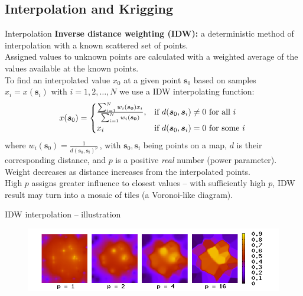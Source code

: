 \documentclass{beamer}
\begin{document}
\subsection{Interpolation and Krigging}
\begin{frame}{Interpolation}
\small
\textbf{Inverse distance weighting (IDW):} a deterministic method of interpolation with a known scattered set of points. \\ \smallskip Assigned values to unknown points are calculated with a weighted average of the values available at the known points.
\\ \smallskip 
To find an interpolated value $x_0$ at a given point $\bm{s}_0$ based on samples $x_i=x(\bm{s}_i)$ with $i=1,2,\dots,N$ we use a IDW interpolating function:
$$
x(\bm{s}_0) = 
\begin{cases}
    \frac{\sum_{i=1}^N w_i(\bm{s_0})x_i}{\sum_{i=1}^N w_i(\bm{s_0})}, & 
    \textnormal{if~} d(\bm{s}_0,\bm{s}_i) \neq 0 \textnormal{~for all~}i\\
    x_i & \textnormal{if~} d(\bm{s}_0,\bm{s}_i)=0 \textnormal{~for some~}i \, 
\end{cases} 
$$
where $w_i(\bm{s}_0)=\frac{1}{d(\bm{s}_0,\bm{s}_i)^p}\,$, with $\bm{s}_0, \bm{s}_i$ being points on a map, $d$ is their corresponding distance, and $p$ is a positive \textit{real} number (power parameter). \\ \medskip
Weight decreases as distance increases from the interpolated points. \\High $p$ assigns greater influence to closest values -- with sufficiently high $p$, IDW result may turn into a mosaic of tiles (a Voronoi-like diagram). 
\end{frame}
\begin{frame}{IDW interpolation -- illustration}
\begin{figure}
	\includegraphics[width=.7\textwidth]{IMG/sp_idw.png}
\end{figure}
\end{frame}
\end{document}
